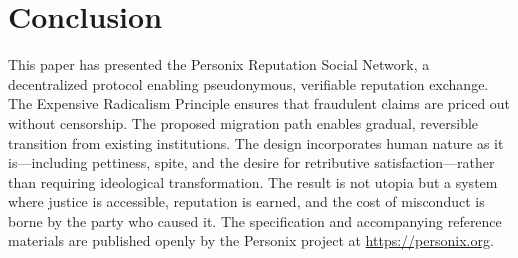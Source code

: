 \documentclass[11pt,a4paper,twocolumn]{article}
\begin{document}
\section{Conclusion}

This paper has presented the Personix Reputation Social Network, a decentralized protocol enabling pseudonymous, verifiable reputation exchange. The Expensive Radicalism Principle ensures that fraudulent claims are priced out without censorship. The proposed migration path enables gradual, reversible transition from existing institutions. The design incorporates human nature as it is---including pettiness, spite, and the desire for retributive satisfaction---rather than requiring ideological transformation. The result is not utopia but a system where justice is accessible, reputation is earned, and the cost of misconduct is borne by the party who caused it. The specification and accompanying reference materials are published openly by the Personix project at \url{https://personix.org}.


\end{document}
